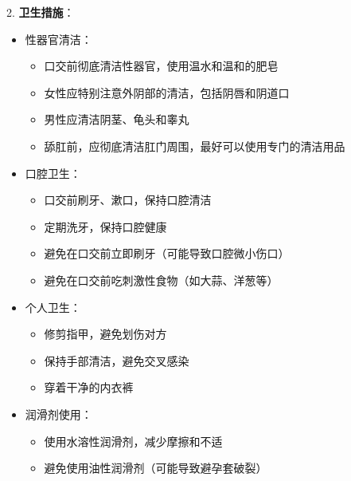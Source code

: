 \documentclass[12pt,UTF8]{ctexbook}
\begin{document}
2. \textbf{卫生措施}：
  \begin{itemize}
  \item 性器官清洁：
    \begin{itemize}
    \item 口交前彻底清洁性器官，使用温水和温和的肥皂
    \item 女性应特别注意外阴部的清洁，包括阴唇和阴道口
    \item 男性应清洁阴茎、龟头和睾丸
    \item 舔肛前，应彻底清洁肛门周围，最好可以使用专门的清洁用品
    \end{itemize}
  \item 口腔卫生：
    \begin{itemize}
    \item 口交前刷牙、漱口，保持口腔清洁
    \item 定期洗牙，保持口腔健康
    \item 避免在口交前立即刷牙（可能导致口腔微小伤口）
    \item 避免在口交前吃刺激性食物（如大蒜、洋葱等）
    \end{itemize}
  \item 个人卫生：
    \begin{itemize}
    \item 修剪指甲，避免划伤对方
    \item 保持手部清洁，避免交叉感染
    \item 穿着干净的内衣裤
    \end{itemize}
  \item 润滑剂使用：
    \begin{itemize}
    \item 使用水溶性润滑剂，减少摩擦和不适
    \item 避免使用油性润滑剂（可能导致避孕套破裂）
    \end{itemize}
  \end{itemize}
\end{document}
